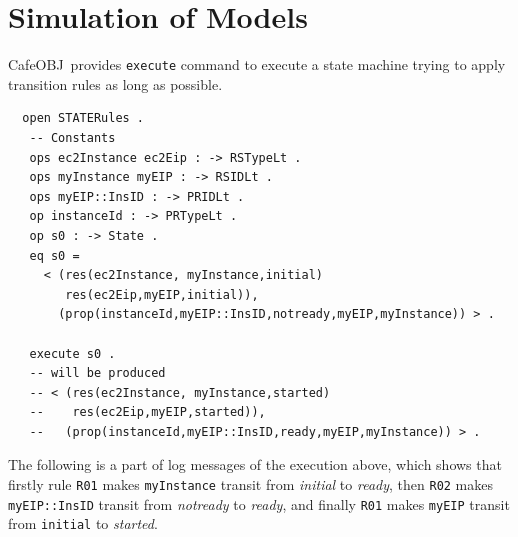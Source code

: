 \documentclass[12pt]{report}
\newcommand{\cafeobj}{{\sf CafeOBJ}~}
\begin{document}
\section{Simulation of Models}
\label{sec:simulation}
\cafeobj provides {\tt execute} command to execute a state machine
trying to apply transition rules as long as possible.
\small
\begin{verbatim}
  open STATERules .
   -- Constants
   ops ec2Instance ec2Eip : -> RSTypeLt .
   ops myInstance myEIP : -> RSIDLt .
   ops myEIP::InsID : -> PRIDLt .
   op instanceId : -> PRTypeLt .
   op s0 : -> State .
   eq s0 =
     < (res(ec2Instance, myInstance,initial)
        res(ec2Eip,myEIP,initial)),
       (prop(instanceId,myEIP::InsID,notready,myEIP,myInstance)) > .
        
   execute s0 . 
   -- will be produced 
   -- < (res(ec2Instance, myInstance,started)
   --    res(ec2Eip,myEIP,started)),
   --   (prop(instanceId,myEIP::InsID,ready,myEIP,myInstance)) > .
\end{verbatim}
\normalsize
The following is a part of log messages of the execution above, which
shows that firstly rule {\tt R01} makes {\tt myInstance} transit
from {\it initial} to {\it ready}, then {\tt R02} makes
{\tt myEIP::InsID} transit from {\it notready} to {\it ready}, and
finally {\tt R01} makes {\tt myEIP} transit from {\tt initial} to
{\it started}.
\small
\end{document}

